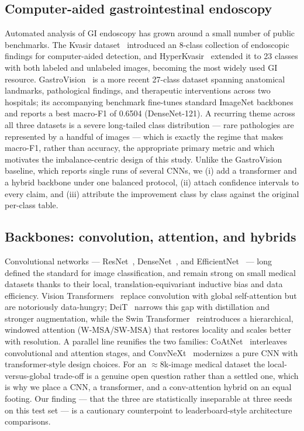 \documentclass[11pt,a4paper]{article}
\newcommand{\macroF}{\textup{macro-F1}}   %
\begin{document}
\subsection{Computer-aided gastrointestinal endoscopy}
Automated analysis of GI endoscopy has grown around a small number of public
benchmarks. The Kvasir dataset~\cite{kvasir} introduced an 8-class collection of
endoscopic findings for computer-aided detection, and HyperKvasir~\cite{hyperkvasir}
extended it to 23 classes with both labeled and unlabeled images, becoming the
most widely used GI resource. GastroVision~\cite{gastrovision} is a more recent
27-class dataset spanning anatomical landmarks, pathological findings, and
therapeutic interventions across two hospitals; its accompanying benchmark
fine-tunes standard ImageNet backbones and reports a best \macroF{} of 0.6504
(DenseNet-121). A recurring theme across all three datasets is a severe
long-tailed class distribution --- rare pathologies are represented by a handful
of images --- which is exactly the regime that makes \macroF{}, rather than
accuracy, the appropriate primary metric and which motivates the imbalance-centric
design of this study. Unlike the GastroVision baseline, which reports single runs
of several CNNs, we (i) add a transformer and a hybrid backbone under one balanced
protocol, (ii) attach confidence intervals to every claim, and (iii) attribute the
improvement class by class against the original per-class table.

\subsection{Backbones: convolution, attention, and hybrids}
Convolutional networks --- ResNet~\cite{resnet}, DenseNet~\cite{densenet}, and
EfficientNet~\cite{efficientnet} --- long defined the standard for image
classification, and remain strong on small medical datasets thanks to their local,
translation-equivariant inductive bias and data efficiency. Vision
Transformers~\cite{vit} replace convolution with global self-attention but are
notoriously data-hungry; DeiT~\cite{deit} narrows this gap with distillation and
stronger augmentation, while the Swin Transformer~\cite{swin} reintroduces a
hierarchical, windowed attention (W-MSA/SW-MSA) that restores locality and scales
better with resolution. A parallel line reunifies the two families: CoAtNet~\cite{coatnet}
interleaves convolutional and attention stages, and ConvNeXt~\cite{convnext}
modernizes a pure CNN with transformer-style design choices. For an
$\approx$8k-image medical dataset the local-versus-global trade-off is a genuine
open question rather than a settled one, which is why we place a CNN, a
transformer, and a conv-attention hybrid on an equal footing. Our finding --- that
the three are statistically inseparable at three seeds on this test set --- is a
cautionary counterpoint to leaderboard-style architecture comparisons.
\end{document}
